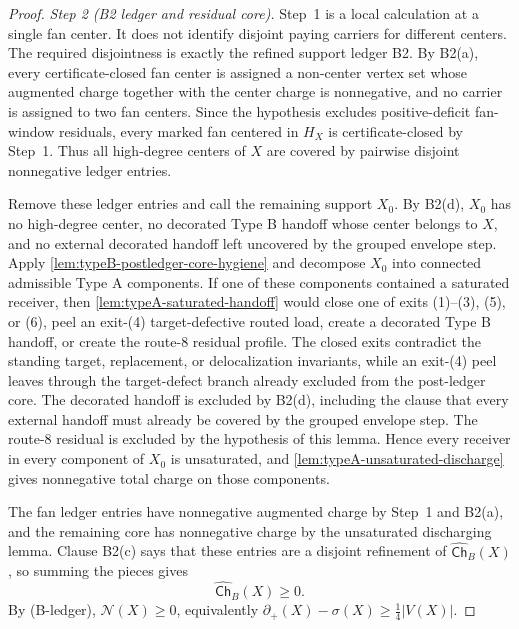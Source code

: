 \documentclass[11pt]{article}
\newcommand{\defp}{\partial_+}
\newcommand{\Ch}{\mathsf{Ch}}
\newcommand{\No}{\mathcal N}
\begin{document}
\begin{proof}
\emph{Step 2 (B2 ledger and residual core).}  Step~1 is a local calculation at a
single fan center.  It does not identify disjoint paying carriers for different
centers.  The required disjointness is exactly the refined support ledger B2.  By
B2(a), every certificate-closed fan center is assigned a non-center vertex set
whose augmented charge together with the center charge is nonnegative, and no
carrier is assigned to two fan centers.
Since the hypothesis excludes positive-deficit fan-window residuals, every
marked fan centered in $H_X$ is certificate-closed by Step~1.  Thus all
high-degree centers of $X$ are covered by pairwise disjoint nonnegative ledger
entries.

Remove these ledger entries and call the remaining support $X_0$.  By B2(d),
$X_0$ has no high-degree center, no decorated Type B handoff whose center
belongs to \(X\), and no external decorated handoff left uncovered by the
grouped envelope step.  Apply \cref{lem:typeB-postledger-core-hygiene} and
decompose \(X_0\) into connected admissible Type A components.  If one of
these components contained a saturated receiver, then
\cref{lem:typeA-saturated-handoff} would close one of exits (1)--(3), (5), or
(6), peel an exit-(4) target-defective routed load, create a decorated Type B
handoff, or create the route-8 residual profile.  The closed exits contradict
the standing target, replacement, or delocalization invariants, while an
exit-(4) peel leaves through the target-defect branch already excluded from the
post-ledger core.
The decorated handoff is excluded by B2(d), including the clause that every
external handoff must already be covered by the grouped envelope step.  The
route-8 residual is excluded by the hypothesis of this
lemma.  Hence every receiver in every component of \(X_0\) is unsaturated, and
\cref{lem:typeA-unsaturated-discharge} gives nonnegative total charge on those
components.

The fan ledger entries have nonnegative augmented charge by Step~1 and B2(a),
and the remaining core has nonnegative charge by the unsaturated discharging
lemma.  Clause B2(c) says that these entries are a disjoint refinement of
$\widehat{\Ch}_B(X)$, so summing the pieces gives
\[
\widehat{\Ch}_B(X)\ge0 .
\]
By \textup{(B-ledger)}, $\No(X)\ge0$, equivalently
$\defp(X)-\sigma(X)\ge\frac14|V(X)|$.
\end{proof}
\end{document}

